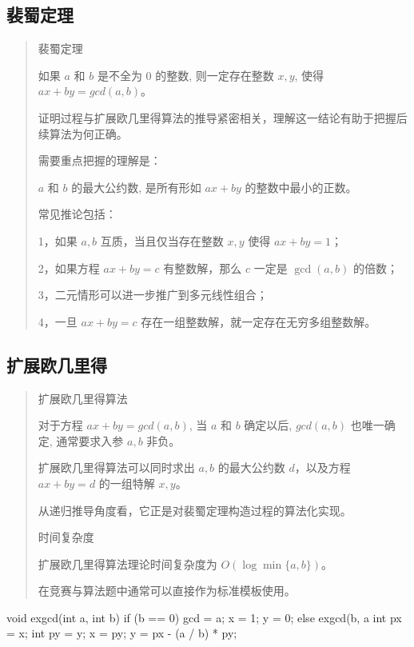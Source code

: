 \documentclass[UTF8,a4paper,11pt]{ctexart}
\newcommand{\topic}[1]{%
  \par\needspace{3\baselineskip}\vspace{0.45em}%
  \noindent{\bfseries\color{Primary}#1}\par\vspace{0.12em}%
}
\begin{document}
\subsection{裴蜀定理}

\topic{裴蜀定理}

\begin{quote}
裴蜀定理\par
如果 $a$ 和 $b$ 是不全为 0 的整数, 则一定存在整数 $x,y$, 使得 $ax + by = gcd(a,b)$。\par
证明过程与扩展欧几里得算法的推导紧密相关，理解这一结论有助于把握后续算法为何正确。\par
\smallskip
需要重点把握的理解是：\par
$a$ 和 $b$ 的最大公约数, 是所有形如 $ax + by$ 的整数中最小的正数。\par
\smallskip
常见推论包括：\par
1，如果 $a,b$ 互质，当且仅当存在整数 $x,y$ 使得 $ax+by=1$；\par
2，如果方程 $ax+by=c$ 有整数解，那么 $c$ 一定是 $\gcd(a,b)$ 的倍数；\par
3，二元情形可以进一步推广到多元线性组合；\par
4，一旦 $ax+by=c$ 存在一组整数解，就一定存在无穷多组整数解。\par
\end{quote}

\subsection{扩展欧几里得}

\begin{quote}
扩展欧几里得算法\par
对于方程 $ax+by=gcd(a,b)$, 当 $a$ 和 $b$ 确定以后, $gcd(a,b)$ 也唯一确定, 通常要求入参 $a,b$ 非负。\par
扩展欧几里得算法可以同时求出 $a,b$ 的最大公约数 $d$，以及方程 $ax+by=d$ 的一组特解 $x,y$。\par
从递归推导角度看，它正是对裴蜀定理构造过程的算法化实现。\par
\smallskip
时间复杂度\par
扩展欧几里得算法理论时间复杂度为 $O(\log \min\{a,b\})$。\par
在竞赛与算法题中通常可以直接作为标准模板使用。\par
\end{quote}

\begin{CodeBlock}
void exgcd(int a, int b) {
    if (b == 0) {
        gcd = a;
        x = 1;
        y = 0;
    } else {
        exgcd(b, a %
        int px = x;
        int py = y;
        x = py;
        y = px - (a / b) * py;
    }
}
\end{CodeBlock}
\end{document}
